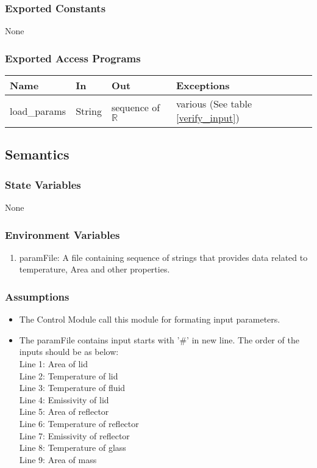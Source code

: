 \documentclass[12pt, titlepage]{article}
\begin{document}
\subsubsection{Exported Constants}
None 
\subsubsection{Exported Access Programs}

\begin{center}
\begin{tabular}{p{2.5cm} p{3.5cm} p{4cm} p{4cm}}
\hline
\textbf{Name} & \textbf{In} & \textbf{Out} & \textbf{Exceptions} \\
\hline
load\_params & String & sequence of $\mathbb{R}$ & various (See table \ref{verify_input}) \\
\hline
\end{tabular}
\end{center}

\subsection{Semantics}

\subsubsection{State Variables}

None

\subsubsection{Environment Variables}

\begin{enumerate}
    \item paramFile: A file containing sequence of strings that provides data related to temperature, Area and other properties. 
\end{enumerate}


\subsubsection{Assumptions}

\begin{itemize}
    \item The Control Module call this module for formating input parameters. 
    \item The paramFile contains input starts with '\#' in new line. The order of the inputs should be as below: \\ 
    Line 1: Area of lid \\
    Line 2: Temperature of lid \\
    Line 3: Temperature of fluid \\
    Line 4: Emissivity of lid \\
    Line 5: Area of reflector \\ 
    Line 6: Temperature of reflector \\ 
    Line 7: Emissivity of reflector \\ 
    Line 8: Temperature of glass \\
    Line 9: Area of mass 
\end{itemize}
\end{document}
